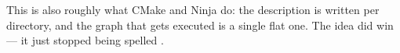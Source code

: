 
\begin{remark}
	This is also roughly what CMake and Ninja do: the description is written per
	directory, and the graph that gets executed is a single flat one. The idea did
	win --- it just stopped being spelled .
\end{remark}
